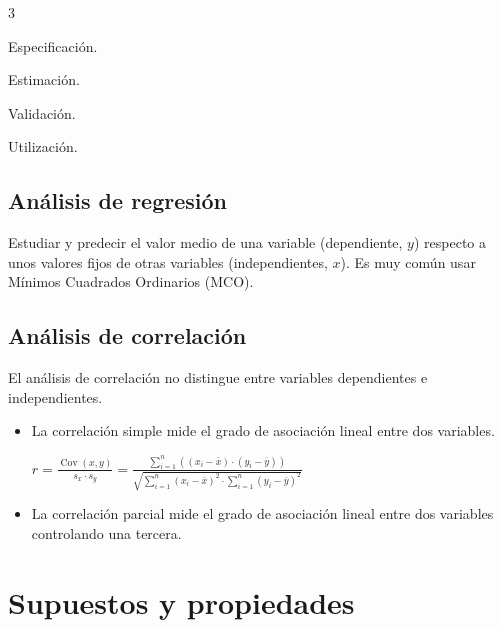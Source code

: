 \documentclass[10pt, a4paper, landscape]{article}
\DeclareMathOperator{\Cov}{Cov}
\begin{document}
\begin{multicols}{3}
\begin{enumerate}[leftmargin=*]
	\begin{minipage}{0.45\columnwidth}
		\item Especificación.
		\item Estimación.
	\end{minipage}
	\hfill
	\begin{minipage}{0.45\columnwidth}
		\item Validación.
		\item Utilización.
	\end{minipage}
\end{enumerate}

\subsection*{Análisis de regresión}

Estudiar y predecir el valor medio de una variable (dependiente, \( y \)) respecto a unos valores fijos de otras variables (independientes, \( x \)). Es muy común usar Mínimos Cuadrados Ordinarios (MCO).

\subsection*{Análisis de correlación}

El análisis de correlación no distingue entre variables dependientes e independientes.

\begin{itemize}[leftmargin=*]
	\item La correlación simple mide el grado de asociación lineal entre dos variables.
	\begin{center}
		\( r = \frac{\Cov(x, y)}{s_{x} \cdot s_{y}} = \frac{\sum_{i = 1}^{n} \left( (x_{i} - \overline{x}) \cdot (y_{i} - \overline{y}) \right)}{\sqrt{\sum_{i = 1}^{n} (x_{i} - \overline{x})^{2} \cdot \sum_{i = 1}^{n} (y_{i} - \overline{y})^{2}}} \)
	\end{center}
	\item La correlación parcial mide el grado de asociación lineal entre dos variables controlando una tercera.
\end{itemize}

\columnbreak

\section*{Supuestos y propiedades}


\end{multicols}
\end{document}
